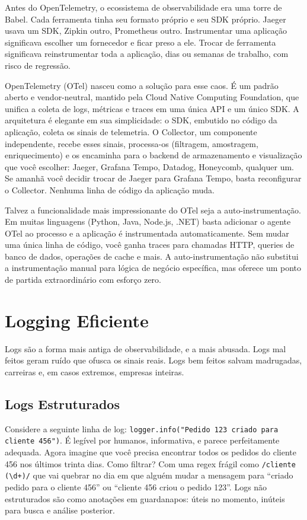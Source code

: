 Antes do OpenTelemetry, o ecossistema de observabilidade era uma torre de Babel.
Cada ferramenta tinha seu formato próprio e seu SDK próprio. Jaeger usava um SDK,
Zipkin outro, Prometheus outro. Instrumentar uma aplicação significava escolher
um fornecedor e ficar preso a ele. Trocar de ferramenta significava
reinstrumentar toda a aplicação, dias ou semanas de trabalho, com risco de
regressão.

OpenTelemetry (OTel) nasceu como a solução para esse caos. É um padrão aberto
e vendor-neutral, mantido pela Cloud Native Computing Foundation, que unifica
a coleta de logs, métricas e traces em uma única API e um único SDK. A
arquitetura é elegante em sua simplicidade: o SDK, embutido no código da
aplicação, coleta os sinais de telemetria. O Collector, um componente
independente, recebe esses sinais, processa-os (filtragem, amostragem,
enriquecimento) e os encaminha para o backend de armazenamento e visualização
que você escolher: Jaeger, Grafana Tempo, Datadog, Honeycomb, qualquer um.
Se amanhã você decidir trocar de Jaeger para Grafana Tempo, basta reconfigurar
o Collector. Nenhuma linha de código da aplicação muda.

Talvez a funcionalidade mais impressionante do OTel seja a auto-instrumentação.
Em muitas linguagens (Python, Java, Node.js, .NET) basta adicionar o
agente OTel ao processo e a aplicação é instrumentada automaticamente. Sem mudar
uma única linha de código, você ganha traces para chamadas HTTP, queries de
banco de dados, operações de cache e mais. A auto-instrumentação não substitui
a instrumentação manual para lógica de negócio específica, mas oferece um ponto
de partida extraordinário com esforço zero.

\section{Logging Eficiente}

Logs são a forma mais antiga de observabilidade, e a mais abusada. Logs
mal feitos geram ruído que ofusca os sinais reais. Logs bem feitos salvam
madrugadas, carreiras e, em casos extremos, empresas inteiras.

\subsection{Logs Estruturados}

Considere a seguinte linha de log: \texttt{logger.info("Pedido 123 criado para
cliente 456")}. É legível por humanos, informativa, e parece perfeitamente
adequada. Agora imagine que você precisa encontrar todos os pedidos do cliente
456 nos últimos trinta dias. Como filtrar? Com uma regex frágil como
\texttt{/cliente (\textbackslash d+)/} que vai quebrar no dia em que alguém mudar
a mensagem para ``criado pedido para o cliente 456'' ou ``cliente 456 criou o
pedido 123''. Logs não estruturados são como anotações em guardanapos: úteis no
momento, inúteis para busca e análise posterior.

